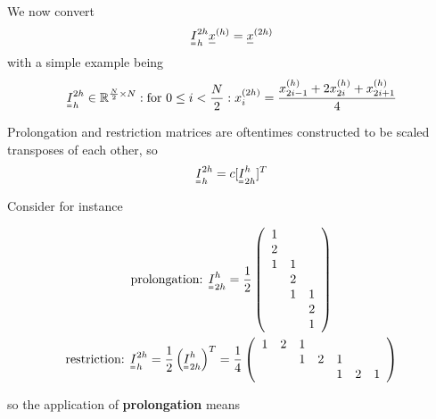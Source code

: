 We now convert
\begin{equation}
    \mat{I}_{h}^{2h} \vec{x}^{(h)} = \vec{x}^{(2h)}
\end{equation}
with a simple example being
\begin{equation}
    \mat{I}_{h}^{2h} \in \mathbb{R}^{\frac{N}{2} \times N}: \text{for } 0 \leq i < \frac{N}{2}: x_i^{(2h)} = \frac{x_{2i-1}^{(h)} + 2x_{2i}^{(h)} + x_{2i+1}^{(h)}}{4}
\end{equation}

Prolongation and restriction matrices are oftentimes constructed to be
scaled transposes of each other, so
\begin{equation}
    \mat{I}_h^{2h} = c[\mat{I}_{2h}^{h}]^T
\end{equation}

Consider for instance

\begin{equation}
    \begin{gathered}
        \text{prolongation: } \mat{I}_{2h}^{h} = \frac{1}{2}\left(\begin{array}{lll}
            1 & & \\
            2 & & \\
            1 & 1 & \\
            & 2 & \\
            & 1 & 1 \\
            & & 2 \\
            & & 1
            \end{array}\right) \\ \text{restriction: } \mat{I}_{h}^{2h} = \frac{1}{2} \left( \mat{I}_{2h}^{h} \right)^T = \frac{1}{4} \left(\begin{array}{lllllll}
                1 & 2 & 1 & & & & \\
                & & 1 & 2 & 1 & & \\
                & & & & 1 & 2 & 1
                \end{array}\right)
    \end{gathered}
\end{equation}

so the application of \textbf{prolongation} means

